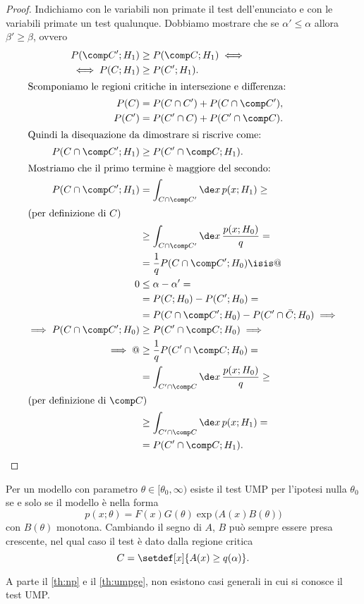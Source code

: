 \begin{proof}
	Indichiamo con le variabili non primate il test dell'enunciato
	e con le variabili primate un test qualunque.
	Dobbiamo mostrare che se $\alpha'\le\alpha$ allora $\beta'\ge\beta$,
	ovvero
	\begin{align*}
		P(\comp C';H_1)
		&\ge P(\comp C;H_1) \iff \\
		\iff P(C;H_1)
		&\ge P(C';H_1). \\
		\intertext{Scomponiamo le regioni critiche in intersezione e differenza:}
		P(C)
		&= P(C\cap C') + P(C\cap\comp C'), \\
		P(C')
		&= P(C'\cap C) + P(C'\cap\comp C). \\
		\intertext{Quindi la disequazione da dimostrare si riscrive come:}
		P(C\cap\comp C';H_1)
		&\ge P(C'\cap\comp C;H_1). \\
		\intertext{Mostriamo che il primo termine è maggiore del secondo:}
		P(C\cap\comp C';H_1)
		&= \int_{C\cap\comp C'} \de x\, p(x;H_1) \ge \\
		\intertext{(per definizione di $C$)}
		&\ge \int_{C\cap\comp C'} \de x\, \frac{p(x;H_0)}q = \\
		&= \frac1q P(C\cap\comp C';H_0) \isis @ \\
		0
		&\le \alpha - \alpha' = \\
		&= P(C;H_0) - P(C';H_0) = \\
		&= P(C\cap\comp C';H_0) - P(C'\cap\bar C;H_0) \implies \\
		\implies P(C\cap\comp C';H_0)
		&\ge P(C'\cap\comp C;H_0) \implies \\
		\implies @
		&\ge \frac1q P(C'\cap\comp C;H_0) = \\
		&= \int_{C'\cap\comp C} \de x\, \frac{p(x;H_0)}q \ge \\
		\intertext{(per definizione di $\comp C$)}
		&\ge \int_{C'\cap\comp C} \de x\, p(x;H_1) = \\
		&= P(C'\cap\comp C;H_1). \qedhere
	\end{align*}
\end{proof}

\begin{fact}
	\label{th:umpge}
	Per un modello con parametro $\theta\in[\theta_0,\infty)$
	esiste il test UMP per l'ipotesi nulla $\theta_0$
	se e solo se il modello è nella forma
	\begin{equation*}
		p(x;\theta)
		= F(x) G(\theta) \exp\big(A(x) B(\theta)\big)
	\end{equation*}
	con $B(\theta)$ monotona.
	Cambiando il segno di $A$, $B$ può sempre essere presa crescente,
	nel qual caso il test è dato dalla regione critica
	\begin{equation*}
		C = \setdef[x]{A(x) \ge q(\alpha)}.
	\end{equation*}
\end{fact}


A parte il \autoref{th:np} e il \autoref{th:umpge},
non esistono casi generali in cui si conosce il test UMP.
